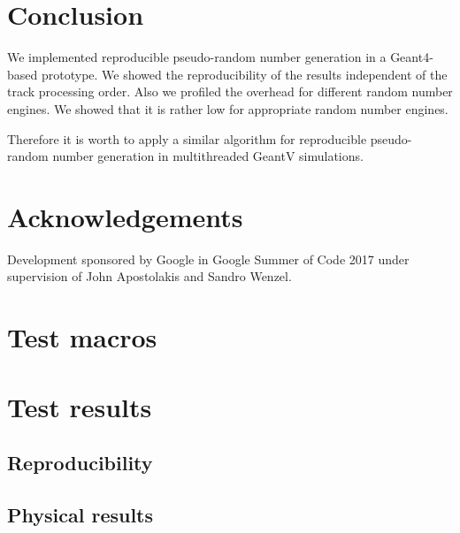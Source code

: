 \documentclass[a4paper, 12pt]{article} %
\begin{document}
 \section{Conclusion}
 
   We implemented reproducible pseudo-random number generation in a Geant4-based prototype.
  We showed the reproducibility of the results independent of the track processing order.
  Also we profiled the overhead for different random number engines.
  We showed that it is rather low for appropriate random number engines.
  
  Therefore it is worth to apply a similar algorithm for reproducible pseudo-random number generation in multithreaded GeantV simulations.
 
 \section{Acknowledgements}
  Development sponsored by Google in Google Summer of Code 2017 under supervision of John Apostolakis and Sandro Wenzel.
 
 \newpage
 
 
 
 \appendix
  \section{Test macros}
   \label{TESTMACROS}
   
   
  
  \section{Test results}
   \label{TESTRESULTS}
   \subsection{Reproducibility}
   
   
   \subsection{Physical results}
\end{document}
